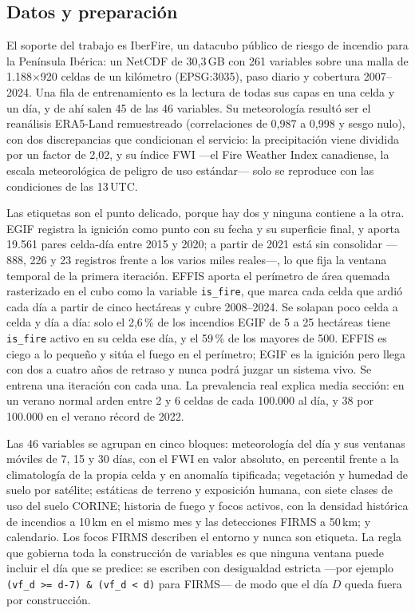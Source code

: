 \documentclass[10pt,a4paper]{article}
\newcommand{\var}[1]{\texttt{\footnotesize #1}}
\begin{document}
\subsection{Datos y preparación}

El soporte del trabajo es IberFire, un datacubo público de riesgo de incendio
para la Península Ibérica: un NetCDF de 30,3\,GB con 261 variables sobre una
malla de 1.188$\times$920 celdas de un kilómetro (EPSG:3035), paso diario y
cobertura 2007--2024. Una fila de entrenamiento es la lectura de todas sus capas
en una celda y un día, y de ahí salen 45 de las 46 variables. Su
meteorología resultó ser el reanálisis ERA5-Land remuestreado (correlaciones de
0,987 a 0,998 y sesgo nulo), con dos discrepancias que condicionan el servicio:
la precipitación viene dividida por un factor de 2,02, y su índice FWI ---el
Fire Weather Index canadiense, la escala meteorológica de peligro de uso
estándar--- solo se reproduce con las condiciones de las 13\,UTC.

Las etiquetas son el punto delicado, porque hay dos y ninguna contiene a la
otra. EGIF registra la ignición como punto con su fecha y su superficie final, y
aporta 19.561 pares celda-día entre 2015 y 2020; a partir de 2021 está sin
consolidar ---888, 226 y 23 registros frente a los varios miles reales---, lo que
fija la ventana temporal de la primera iteración. EFFIS aporta el perímetro de
área quemada rasterizado en el cubo como la variable \var{is\_fire}, que marca
cada celda que ardió cada día a partir de cinco hectáreas y cubre 2008--2024. Se solapan poco celda a celda y día a
día: solo el 2,6\,\% de los incendios EGIF de 5 a 25 hectáreas tiene
\var{is\_fire} activo en su celda ese día, y el 59\,\% de los mayores de 500.
EFFIS es ciego a lo pequeño y sitúa el fuego en el perímetro; EGIF es la ignición
pero llega con dos a cuatro años de retraso y nunca podrá juzgar un sistema vivo.
Se entrena una iteración con cada una. La
prevalencia real explica media sección: en un verano normal arden entre 2 y 6
celdas de cada 100.000 al día, y 38 por 100.000 en el verano récord de 2022.

Las 46 variables se agrupan en cinco bloques: meteorología del día y sus
ventanas móviles de 7, 15 y 30 días, con el FWI en valor absoluto, en percentil
frente a la climatología de la propia celda y en anomalía tipificada; vegetación
y humedad de suelo por satélite; estáticas de terreno y exposición humana, con
siete clases de uso del suelo CORINE; historia de fuego y focos activos, con la
densidad histórica de incendios a 10\,km en el mismo mes y las detecciones FIRMS
a 50\,km; y calendario. Los focos FIRMS describen el entorno y nunca son
etiqueta. La regla que
gobierna toda la construcción de variables es que ninguna ventana puede incluir
el día que se predice: se escriben con desigualdad estricta ---por ejemplo
\var{(vf\_d >= d-7) \& (vf\_d < d)} para FIRMS--- de modo que el día $D$ queda
fuera por construcción.
\end{document}
